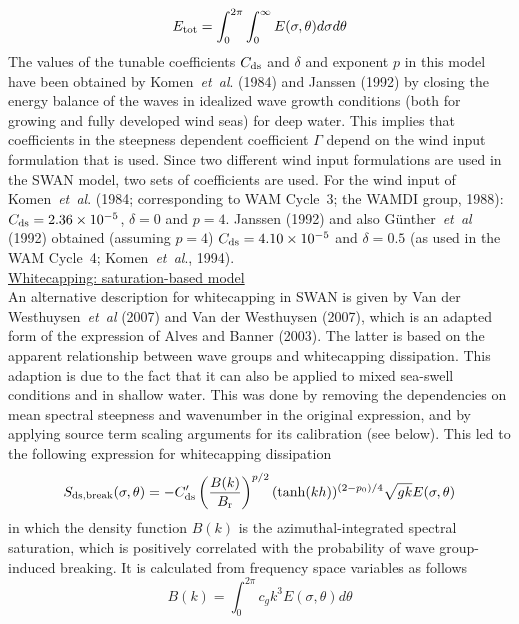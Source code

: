 \documentclass[12pt]{book}
\begin{document}
\begin{equation}
  E_{\rm tot} = \int_{0}^{2\pi} \int_{0}^{\infty} E(\sigma,\theta)d\sigma d\theta
  \label{eq3-16}
\end{equation}
The values of the tunable coefficients $C_{\rm ds}$ and $\delta$ and exponent $p$ in this model have been obtained by
Komen~{\it et~al}. (1984) and Janssen (1992) by closing the energy balance of the waves in idealized wave growth conditions
(both for growing and fully developed wind seas) for deep water. This implies that coefficients in the steepness dependent
coefficient $\Gamma$ depend on the wind input formulation that is used. Since two different wind input formulations are
used in the SWAN model, two sets of coefficients are used. For the wind input of Komen~{\it et~al}. (1984; corresponding to WAM
Cycle~3; the WAMDI group, 1988): $C_{\rm ds} = 2.36 \times 10^{-5}$, $\delta=0$ and $p=4$. Janssen (1992) and also
G\"{u}nther~{\it et~al} (1992) obtained (assuming $p=4$) $C_{\rm ds} = 4.10 \times 10^{-5}$ and $\delta=0.5$ (as used in the WAM
Cycle~4; Komen~{\it et~al}., 1994).
\\[2ex]
\noindent
\underline{Whitecapping: saturation-based model}\\[2ex]
An alternative description for whitecapping in SWAN is given by Van der Westhuysen~{\it et~al} (2007) and
Van der Westhuysen (2007), which is an adapted form of the expression of Alves and Banner (2003). The latter is based
on the apparent relationship between wave groups and whitecapping dissipation. This adaption is due to the fact that it
can also be applied to mixed sea-swell conditions and in shallow water. This was done by removing the dependencies on mean
spectral steepness and wavenumber in the original expression, and by applying source term scaling arguments for its
calibration (see below). This led to the following expression for whitecapping dissipation
\begin{equation}
  S_{\rm ds,break} (\sigma,\theta) = -C'_{\rm ds} \left( \frac{B(k)}{B_{\rm r}} \right)^{p/2} (\tanh(kh))^{(2-p_0)/4}
                                  \sqrt{gk} E(\sigma,\theta)
  \label{eq:satu}
\end{equation}
in which the density function $B(k)$ is the azimuthal-integrated spectral saturation, which is positively correlated with
the probability of wave group-induced breaking. It is calculated from frequency space variables as follows
\begin{equation}
  B(k) = \int_{0}^{2\pi} c_g k^3 E(\sigma,\theta) d\theta
\end{equation}
\end{document}
